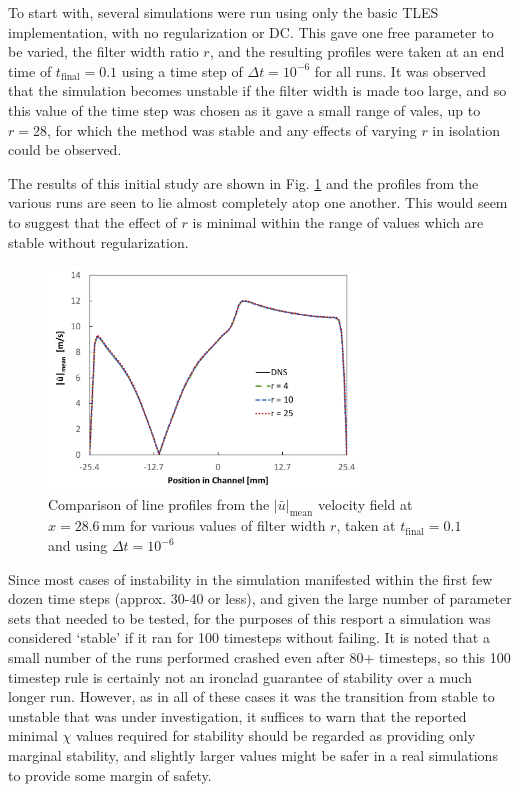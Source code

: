 To start with, several simulations were run using only the basic TLES implementation, with no regularization or DC. This gave one free parameter to be varied, the filter width ratio $r$, and the resulting profiles were taken at an end time of $t_\mathrm{final}=0.1$ using a time step of $\Delta t=10^{-6}$ for all runs. It was observed that the simulation becomes unstable if the filter width is made too large, and so this value of the time step was chosen as it gave a small range of vales, up to $r=28$, for which the method was stable and any effects of varying $r$ in isolation could be observed.

The results of this initial study are shown in Fig. \ref{fig:line_data_no_reg} and the profiles from the various runs are seen to lie almost completely atop one another. This would seem to suggest that the effect of $r$ is minimal within the range of values which are stable without regularization.

\begin{figure}[!htb]
\centering
\includegraphics[width=0.75\textwidth]{figures/line_data_no_reg.pdf}
\caption{Comparison of line profiles from the $|\bar{u}|_{\mathrm{mean}}$ velocity field at $x=28.6\,\mathrm{mm}$ for various values of filter width $r$, taken at $t_\mathrm{final}=0.1$ and using $\Delta t=10^{-6}$}
\label{fig:line_data_no_reg}
\end{figure}

Since most cases of instability in the simulation manifested within the first few dozen time steps (approx. 30-40 or less), and given the large number of parameter sets that needed to be tested, for the purposes of this resport a simulation was considered `stable' if it ran for 100 timesteps without failing. It is noted that a small number of the runs performed crashed even after 80+ timesteps, so this 100 timestep rule is certainly not an ironclad guarantee of stability over a much longer run. However, as in all of these cases it was the transition from stable to unstable that was under investigation, it suffices to warn that the reported minimal $\chi$ values required for stability should be regarded as providing only marginal stability, and slightly larger values might be safer in a real simulations to provide some margin of safety.

